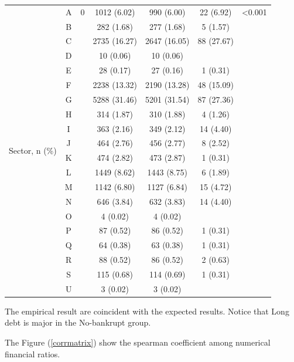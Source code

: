 \documentclass[journal]{IEEEtai}
\begin{document}
\begin{table}[!h]
\begin{tabular*}{\textwidth}{@{}*{7}{c}}
\multirow[t]{20}{*}{Sector, n (\%)} & A & 0 & 1012 (6.02) & 990 (6.00) & 22 (6.92) & <0.001 \\
 & B &  & 282 (1.68) & 277 (1.68) & 5 (1.57) &  \\
 & C &  & 2735 (16.27) & 2647 (16.05) & 88 (27.67) &  \\
 & D &  & 10 (0.06) & 10 (0.06) &  &  \\
 & E &  & 28 (0.17) & 27 (0.16) & 1 (0.31) &  \\
 & F &  & 2238 (13.32) & 2190 (13.28) & 48 (15.09) &  \\
 & G &  & 5288 (31.46) & 5201 (31.54) & 87 (27.36) &  \\
 & H &  & 314 (1.87) & 310 (1.88) & 4 (1.26) &  \\
 & I &  & 363 (2.16) & 349 (2.12) & 14 (4.40) &  \\
 & J &  & 464 (2.76) & 456 (2.77) & 8 (2.52) &  \\
 & K &  & 474 (2.82) & 473 (2.87) & 1 (0.31) &  \\
 & L &  & 1449 (8.62) & 1443 (8.75) & 6 (1.89) &  \\
 & M &  & 1142 (6.80) & 1127 (6.84) & 15 (4.72) &  \\
 & N &  & 646 (3.84) & 632 (3.83) & 14 (4.40) &  \\
 & O &  & 4 (0.02) & 4 (0.02) &  &  \\
 & P &  & 87 (0.52) & 86 (0.52) & 1 (0.31) &  \\
 & Q &  & 64 (0.38) & 63 (0.38) & 1 (0.31) &  \\
 & R &  & 88 (0.52) & 86 (0.52) & 2 (0.63) &  \\
 & S &  & 115 (0.68) & 114 (0.69) & 1 (0.31) &  \\
 & U &  & 3 (0.02) & 3 (0.02) &  &  \\
\bottomrule
\end{tabular*}
\end{table}

The empirical result are coincident with the expected results. Notice that Long debt is major in the No-bankrupt group.


The Figure (\ref{corrmatrix})  show the  spearman coefficient among numerical financial ratios.
\end{document}
